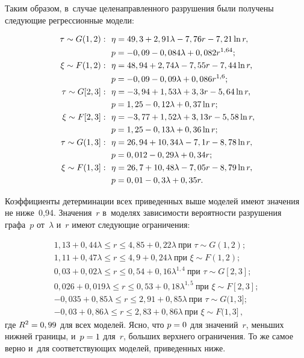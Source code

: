\begin{multicols}{2}
Таким образом, в~случае целенаправленного разрушения были получены 
сле\-ду\-ющие регрессионные модели:

\pagebreak

\noindent
\begin{align*}
\tau\sim {G}(1,2):\ \  & \eta = 49,3+2,91\lambda-7,76r-7,21\ln r,\\
& p = -0,09-0,084\lambda+0,082r^{1,64};\\
\xi\sim F(1,2):\ \  & \eta = 48,94+2,74\lambda-7,55r-7,44\ln r,\\
& p = -0,09-0,09\lambda+0,086r^{1,6};\\
\tau\sim {G}[2,3]:\ \  & \eta = -3,94+1,53\lambda+3,3r-5,64\ln r,\\
& p = 1,25-0,12\lambda+0,37\ln r;\\
\xi\sim F[2,3]:\ \  & \eta = -3,77+1,52\lambda+3,13r-5,58\ln r,\hspace*{-2.8pt}\\
& p = 1,25-0,13\lambda+0,36\ln r;\\
\tau\sim {G}(1,3]:\  \ & \eta = 26,94+10,34\lambda-7,1r-8,78\ln r,\\
& p = 0,012-0,29\lambda+0,34r;\\
\xi\sim F(1,3]:\ \  & \eta = 26,7+10,48\lambda-7,05r-8,79\ln r,\\
& p = 0,01-0,3\lambda+0,35r.
\end{align*}

Коэффициенты детерминации всех приведенных выше моделей имеют значения не
ниже~0,94. Значения~$r$ в~моделях за\-ви\-си\-мости ве\-ро\-ят\-ности разрушения графа~$p$ 
от~$\lambda$ и~$r$ име\-ют сле\-ду\-ющие ограничения:

\noindent
\begin{gather*}%
1{,}13+0{,}44\lambda\leq r\leq 4{,}85+0{,}22\lambda\ \mbox{при }
\tau\sim{G}(1,2);\\
1{,}11+0{,}47\lambda\leq r\leq 4{,}9+0{,}24\lambda\  \mbox{при }
\xi\sim F(1,2);\\
0{,}03+0{,}02\lambda\leq r\leq 0{,}54+0{,}16\lambda^{1,4}\
\mbox{при } \tau\sim {G}[2,3];\\
0{,}026+0{,}019\lambda\leq r\leq 0{,}53+0{,}18\lambda^{1,5}\
\mbox{при } \xi\sim F[2,3];\\
-0{,}035+0{,}85\lambda\leq r\leq 2{,}91+0{,}85\lambda\
\mbox{при } \tau\sim {G}(1,3];\\
-0{,}03+0{,}86\lambda\leq r\leq 2{,}83+0{,}86\lambda\
\mbox{при } \xi\sim F(1,3]\,,
\end{gather*}
где $R^2\hm=0,99$ для всех моделей. Ясно, что $p\hm=0$ для значений~$r$, 
меньших ниж\-ней
границы, и~$p\hm=1$ для~$r$, больших верх\-не\-го ограничения. То же самое вер\-но и~для
со\-от\-вет\-ст\-ву\-ющих моделей, приведенных ниже.


\end{multicols}
